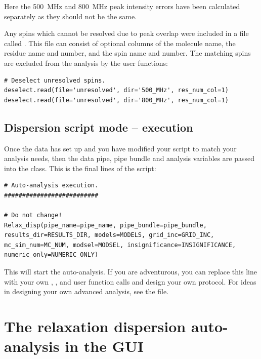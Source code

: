 Here the 500~MHz and 800~MHz peak intensity errors have been calculated separately as they should not be the same.

Any spins which cannot be resolved due to peak overlap were included in a file called .
This file can consist of optional columns of the molecule name, the residue name and number, and the spin name and number.
The matching spins are excluded from the analysis by the user functions:

\begin{lstlisting}[firstnumber=123]
# Deselect unresolved spins.
deselect.read(file='unresolved', dir='500_MHz', res_num_col=1)
deselect.read(file='unresolved', dir='800_MHz', res_num_col=1)
\end{lstlisting}


\subsection{Dispersion script mode -- execution}

Once the data has set up and you have modified your script to match your analysis needs, then the data pipe, pipe bundle and analysis variables are passed into the  class.
This is the final lines of the script:

\begin{lstlisting}[firstnumber=129]
# Auto-analysis execution.
##########################

# Do not change!
Relax_disp(pipe_name=pipe_name, pipe_bundle=pipe_bundle, results_dir=RESULTS_DIR, models=MODELS, grid_inc=GRID_INC, mc_sim_num=MC_NUM, modsel=MODSEL, insignificance=INSIGNIFICANCE, numeric_only=NUMERIC_ONLY)
\end{lstlisting}

This will start the auto-analysis.
If you are adventurous, you can replace this line with your own , , and  user function calls and design your own protocol.
For ideas in designing your own advanced analysis, see the  file.




\newpage
\section{The relaxation dispersion auto-analysis in the GUI}

